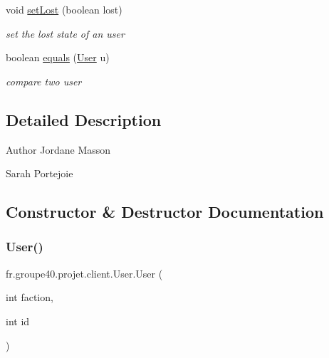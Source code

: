 \begin{DoxyCompactItemize}
void \hyperlink{classfr_1_1groupe40_1_1projet_1_1client_1_1_user_af0d8095643e7901ef0320d4245da0771}{set\+Lost} (boolean lost)
\begin{DoxyCompactList}\small\item\em set the lost state of an user \end{DoxyCompactList}\item 
boolean \hyperlink{classfr_1_1groupe40_1_1projet_1_1client_1_1_user_a9ef8e41efa22dad7be2e4b9966ff7818}{equals} (\hyperlink{classfr_1_1groupe40_1_1projet_1_1client_1_1_user}{User} u)
\begin{DoxyCompactList}\small\item\em compare two user \end{DoxyCompactList}\end{DoxyCompactItemize}


\subsection{Detailed Description}
\begin{DoxyAuthor}{Author}
Jordane Masson 

Sarah Portejoie 
\end{DoxyAuthor}


\subsection{Constructor \& Destructor Documentation}
\mbox{\label{classfr_1_1groupe40_1_1projet_1_1client_1_1_user_acd2d859d7679c886c0445aa8d18f177f}} 
\subsubsection{\texorpdfstring{User()}{User()}\hspace{0.1cm}{\footnotesize\ttfamily [1/3]}}
{\footnotesize\ttfamily fr.\+groupe40.\+projet.\+client.\+User.\+User (\begin{DoxyParamCaption}\item[{int}]{faction,  }\item[{int}]{id }\end{DoxyParamCaption})}



